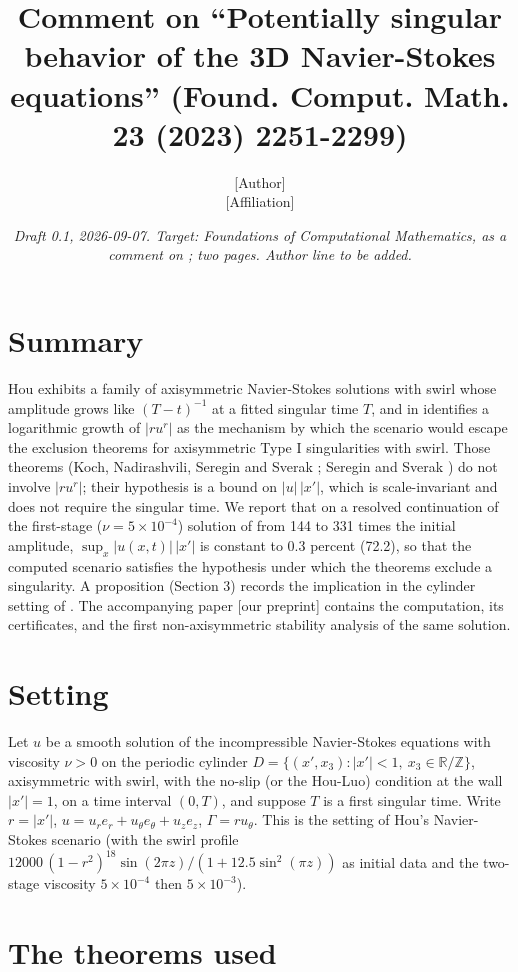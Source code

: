 \documentclass[11pt]{article}
\title{Comment on ``Potentially singular behavior of the 3D Navier-Stokes equations'' (Found. Comput. Math. 23 (2023) 2251-2299)}
\author{[Author]\\ {}[Affiliation]}
\date{\emph{Draft 0.1, 2026-09-07. Target: Foundations of Computational Mathematics, as a comment on \cite{H23b}; two pages. Author line to be added.}}
\newcommand{\sn}[2]{#1\times 10^{#2}}
\begin{document}
\maketitle

\section*{Summary}

Hou \cite{H23b} exhibits a family of axisymmetric Navier-Stokes solutions with swirl whose amplitude grows like $(T - t)^{-1}$ at a fitted singular time $T$, and in \cite[Sec. 1.5]{H24} identifies a logarithmic growth of $|r u^r|$ as the mechanism by which the scenario would escape the exclusion theorems for axisymmetric Type I singularities with swirl. Those theorems (Koch, Nadirashvili, Seregin and Sverak \cite[Thms. 5.3 and 6.1]{KNSS09}; Seregin and Sverak \cite[Thm. 1.1]{SS09}) do not involve $|r u^r|$; their hypothesis is a bound on $|u|\,|x'|$, which is scale-invariant and does not require the singular time. We report that on a resolved continuation of the first-stage ($\nu = \sn{5}{-4}$) solution of \cite{H23b} from 144 to 331 times the initial amplitude, $\sup_x |u(x, t)|\,|x'|$ is constant to 0.3 percent (72.2), so that the computed scenario satisfies the hypothesis under which the theorems exclude a singularity. A proposition (Section 3) records the implication in the cylinder setting of \cite{H23b}. The accompanying paper [our preprint] contains the computation, its certificates, and the first non-axisymmetric stability analysis of the same solution.

\section{Setting}

Let $u$ be a smooth solution of the incompressible Navier-Stokes equations with viscosity $\nu > 0$ on the periodic cylinder $D = \{(x', x_3) : |x'| < 1,\ x_3 \in \mathbb{R} / \mathbb{Z}\}$, axisymmetric with swirl, with the no-slip (or the Hou-Luo) condition at the wall $|x'| = 1$, on a time interval $(0, T)$, and suppose $T$ is a first singular time. Write $r = |x'|$, $u = u_r e_r + u_\theta e_\theta + u_z e_z$, $\Gamma = r u_\theta$. This is the setting of Hou's Navier-Stokes scenario \cite{H23b} (with the swirl profile $12000\,(1 - r^2)^{18} \sin(2 \pi z) / (1 + 12.5 \sin^2(\pi z))$ as initial data and the two-stage viscosity $\sn{5}{-4}$ then $\sn{5}{-3}$).

\section{The theorems used}
\end{document}
